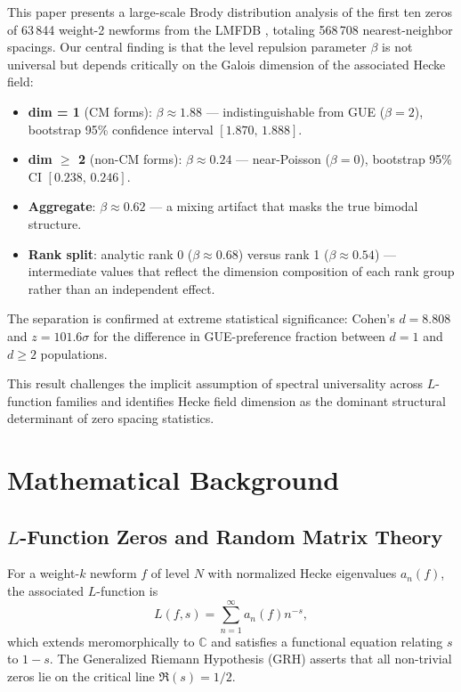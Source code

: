 \documentclass[11pt]{article}
\newcommand{\C}{\mathbb{C}}
\begin{document}
This paper presents a large-scale Brody distribution analysis of the
first ten zeros of 63\,844 weight-2 newforms from the LMFDB
\cite{lmfdb}, totaling 568\,708 nearest-neighbor spacings.  Our central
finding is that the level repulsion parameter $\beta$ is not universal
but depends critically on the Galois dimension of the associated
Hecke field:

\begin{itemize}
  \item \textbf{dim = 1} (CM forms): $\beta \approx 1.88$ ---
    indistinguishable from GUE ($\beta=2$), bootstrap 95\% confidence
    interval $[1.870,\,1.888]$.
  \item \textbf{dim $\ge$ 2} (non-CM forms): $\beta \approx 0.24$ ---
    near-Poisson ($\beta=0$), bootstrap 95\% CI $[0.238,\,0.246]$.
  \item \textbf{Aggregate}: $\beta \approx 0.62$ --- a mixing artifact
    that masks the true bimodal structure.
  \item \textbf{Rank split}: analytic rank 0 ($\beta\approx0.68$)
    versus rank 1 ($\beta\approx0.54$) --- intermediate values that
    reflect the dimension composition of each rank group rather than an
    independent effect.
\end{itemize}

The separation is confirmed at extreme statistical significance:
Cohen's $d = 8.808$ and $z = 101.6\sigma$ for the difference in
GUE-preference fraction between $d=1$ and $d\ge2$ populations.

This result challenges the implicit assumption of spectral universality
across $L$-function families and identifies Hecke field dimension as
the dominant structural determinant of zero spacing statistics.

\section{Mathematical Background}
\label{sec:background}

\subsection{$L$-Function Zeros and Random Matrix Theory}

For a weight-$k$ newform $f$ of level $N$ with normalized Hecke
eigenvalues $a_n(f)$, the associated $L$-function is
\begin{equation}
L(f,s) = \sum_{n=1}^\infty a_n(f) n^{-s},
\end{equation}
which extends meromorphically to $\C$ and satisfies a functional
equation relating $s$ to $1-s$.  The Generalized Riemann Hypothesis
(GRH) asserts that all non-trivial zeros lie on the critical line
$\Re(s) = 1/2$.
\end{document}
